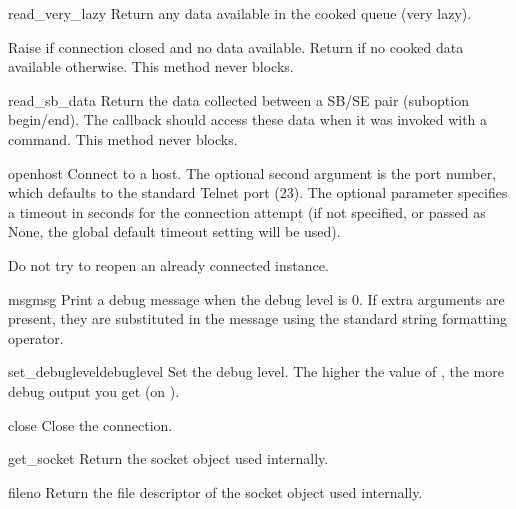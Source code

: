 \begin{methoddesc}{read_very_lazy}{}
Return any data available in the cooked queue (very lazy).

Raise  if connection closed and no data available.
Return  if no cooked data available otherwise.  This method
never blocks.
\end{methoddesc}

\begin{methoddesc}{read_sb_data}{}
Return the data collected between a SB/SE pair (suboption begin/end).
The callback should access these data when it was invoked with a
 command. This method never blocks.

\end{methoddesc}

\begin{methoddesc}{open}{host}
Connect to a host.
The optional second argument is the port number, which
defaults to the standard Telnet port (23).
The optional  parameter specifies a timeout in seconds for the
connection attempt (if not specified, or passed as None, the global default
timeout setting will be used).

Do not try to reopen an already connected instance.
\end{methoddesc}

\begin{methoddesc}{msg}{msg}
Print a debug message when the debug level is \code{>} 0.
If extra arguments are present, they are substituted in the
message using the standard string formatting operator.
\end{methoddesc}

\begin{methoddesc}{set_debuglevel}{debuglevel}
Set the debug level.  The higher the value of , the
more debug output you get (on ).
\end{methoddesc}

\begin{methoddesc}{close}{}
Close the connection.
\end{methoddesc}

\begin{methoddesc}{get_socket}{}
Return the socket object used internally.
\end{methoddesc}

\begin{methoddesc}{fileno}{}
Return the file descriptor of the socket object used internally.
\end{methoddesc}

